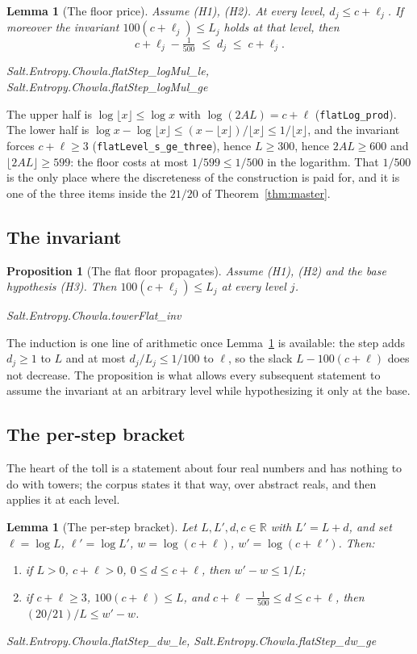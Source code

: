 \documentclass[11pt]{amsart}
\newcommand{\leanname}[1]{\par{\noindent\small\ttfamily\raggedright #1\par}}
\newcommand{\leaninline}[1]{{\small\texttt{#1}}}
\newtheorem{proposition}[theorem]{Proposition}
\newtheorem{lemma}[theorem]{Lemma}
\theoremstyle{remark}
\begin{document}
\begin{lemma}[The floor price]\label{lem:floorprice}
Assume (H1), (H2). At every level, $d_j \le c + \ell_j$. If moreover
the invariant $100(c+\ell_j) \le L_j$ holds at that level, then
\[
c + \ell_j - \tfrac{1}{500} \;\le\; d_j \;\le\; c + \ell_j .
\]
\leanname{Salt.Entropy.Chowla.flatStep\_logMul\_le,
Salt.Entropy.Chowla.flatStep\_logMul\_ge}
\end{lemma}

The upper half is $\log\lfloor x\rfloor \le \log x$ with
$\log(2AL) = c + \ell$ (\leaninline{flatLog\_prod}). The lower half is
$\log x - \log\lfloor x \rfloor \le (x - \lfloor x\rfloor)/\lfloor
x\rfloor \le 1/\lfloor x \rfloor$, and the invariant forces
$c + \ell \ge 3$ (\leaninline{flatLevel\_s\_ge\_three}), hence
$L \ge 300$, hence $2AL \ge 600$ and $\lfloor 2AL\rfloor \ge 599$: the
floor costs at most $1/599 \le 1/500$ in the logarithm. That $1/500$ is
the only place where the discreteness of the construction is paid for, and
it is one of the three items inside the $21/20$ of
Theorem~\ref{thm:master}.

\subsection{The invariant}

\begin{proposition}[The flat floor propagates]\label{prop:inv}
Assume (H1), (H2) and the base hypothesis (H3). Then
$100(c + \ell_j) \le L_j$ at every level $j$.
\leanname{Salt.Entropy.Chowla.towerFlat\_inv}
\end{proposition}

The induction is one line of arithmetic once Lemma~\ref{lem:floorprice} is
available: the step adds $d_j \ge 1$ to $L$ and at most $d_j/L_j \le
1/100$ to $\ell$, so the slack $L - 100(c+\ell)$ does not decrease.
The proposition is what allows every subsequent statement to assume the
invariant at an arbitrary level while hypothesizing it only at the base.

\subsection{The per-step bracket}
The heart of the toll is a statement about four real numbers and has
nothing to do with towers; the corpus states it that way, over abstract
reals, and then applies it at each level.

\begin{lemma}[The per-step bracket]\label{lem:step}
Let $L, L', d, c \in \mathbb{R}$ with $L' = L + d$, and set
$\ell = \log L$, $\ell' = \log L'$, $w = \log(c+\ell)$,
$w' = \log(c+\ell')$. Then:
\begin{enumerate}
\item[(i)] if $L > 0$, $c + \ell > 0$, $0 \le d \le c + \ell$, then
  $w' - w \le 1/L$;
\item[(ii)] if $c + \ell \ge 3$, $100(c+\ell) \le L$, and
  $c + \ell - \tfrac{1}{500} \le d \le c + \ell$, then
  $(20/21)/L \le w' - w$.
\end{enumerate}
\leanname{Salt.Entropy.Chowla.flatStep\_dw\_le,
Salt.Entropy.Chowla.flatStep\_dw\_ge}
\end{lemma}
\end{document}
